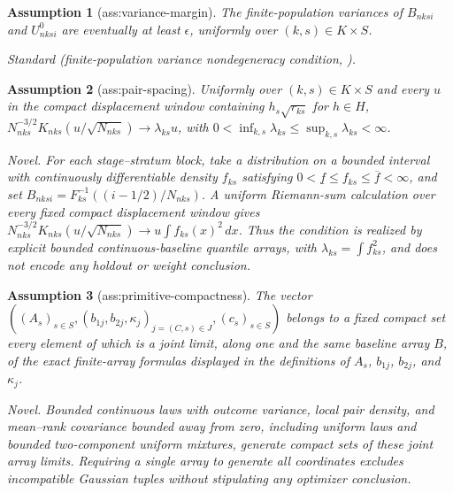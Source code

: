 \documentclass{article}
\newtheorem{assumption}{Assumption}
\begin{document}
\begin{assumption}[ass:variance-margin]\label{ass:variance-margin}
The finite-population variances of \(B_{nksi}\) and \(U^0_{nksi}\) are eventually at least \(\epsilon\), uniformly over \((k,s)\in K\times S\).
\par\smallskip\noindent\emph{Standard} (finite-population variance nondegeneracy condition, \cite{ShiDing2025BerryEsseen}).
\end{assumption}

\begin{assumption}[ass:pair-spacing]\label{ass:pair-spacing}
Uniformly over \((k,s)\in K\times S\) and every \(u\) in the compact displacement window containing \(h_s\sqrt{r_{ks}}\) for \(h\in H\), \(N_{nks}^{-3/2}K_{nks}(u/\sqrt{N_{nks}})\to\lambda_{ks}u\), with \(0<\inf_{k,s}\lambda_{ks}\le\sup_{k,s}\lambda_{ks}<\infty\).
\par\smallskip\noindent\emph{Novel.} For each stage--stratum block, take a distribution on a bounded interval with continuously differentiable density \(f_{ks}\) satisfying \(0<\underline f\le f_{ks}\le\overline f<\infty\), and set \(B_{nksi}=F_{ks}^{-1}((i-1/2)/N_{nks})\). A uniform Riemann-sum calculation over every fixed compact displacement window gives \(N_{nks}^{-3/2}K_{nks}(u/\sqrt{N_{nks}})\to u\int f_{ks}(x)^2\,dx\). Thus the condition is realized by explicit bounded continuous-baseline quantile arrays, with \(\lambda_{ks}=\int f_{ks}^2\), and does not encode any holdout or weight conclusion.
\end{assumption}

\begin{assumption}[ass:primitive-compactness]\label{ass:primitive-compactness}
The vector \( ((A_s)_{s\in S},(b_{1j},b_{2j},\kappa_j)_{j=(C,s)\in J},(c_s)_{s\in S})\) belongs to a fixed compact set every element of which is a joint limit, along one and the same baseline array \(B\), of the exact finite-array formulas displayed in the definitions of \(A_s\), \(b_{1j}\), \(b_{2j}\), and \(\kappa_j\).
\par\smallskip\noindent\emph{Novel.} Bounded continuous laws with outcome variance, local pair density, and mean--rank covariance bounded away from zero, including uniform laws and bounded two-component uniform mixtures, generate compact sets of these joint array limits. Requiring a single array to generate all coordinates excludes incompatible Gaussian tuples without stipulating any optimizer conclusion.
\end{assumption}
\end{document}
